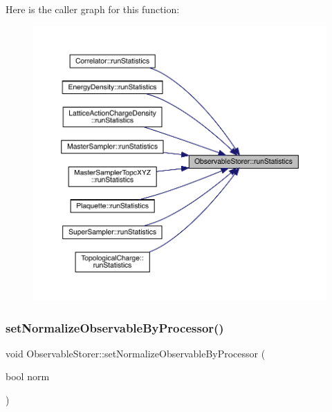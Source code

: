 Here is the caller graph for this function\+:\nopagebreak
\begin{figure}[H]
\begin{center}
\leavevmode
\includegraphics[width=350pt]{class_observable_storer_a41b3756b423d31c6535d2981ef92d1a1_icgraph}
\end{center}
\end{figure}
\mbox{\label{class_observable_storer_a6177ade7609fb0e4b739955eecba20e6}} 
\subsubsection{\texorpdfstring{setNormalizeObservableByProcessor()}{setNormalizeObservableByProcessor()}}
{\footnotesize\ttfamily void Observable\+Storer\+::set\+Normalize\+Observable\+By\+Processor (\begin{DoxyParamCaption}\item[{bool}]{norm }\end{DoxyParamCaption})\hspace{0.3cm}{\ttfamily [inline]}}

